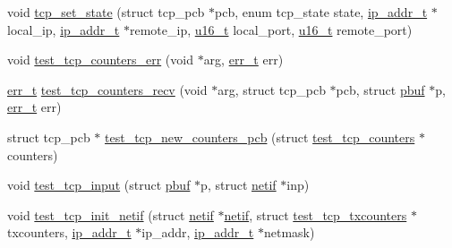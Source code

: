 \begin{DoxyCompactItemize}
\item 
void \hyperlink{openmote-cc2538_2lwip_2test_2unit_2tcp_2tcp__helper_8c_a39f3f73a5ac75fb0de5253cc0a1da423}{tcp\+\_\+set\+\_\+state} (struct tcp\+\_\+pcb $\ast$pcb, enum tcp\+\_\+state state, \hyperlink{native_2lwip_2src_2include_2lwip_2ip__addr_8h_a88b43639738c4de2d3cd22e3a1fd7696}{ip\+\_\+addr\+\_\+t} $\ast$local\+\_\+ip, \hyperlink{native_2lwip_2src_2include_2lwip_2ip__addr_8h_a88b43639738c4de2d3cd22e3a1fd7696}{ip\+\_\+addr\+\_\+t} $\ast$remote\+\_\+ip, \hyperlink{group__compiler__abstraction_ga77570ac4fcab86864fa1916e55676da2}{u16\+\_\+t} local\+\_\+port, \hyperlink{group__compiler__abstraction_ga77570ac4fcab86864fa1916e55676da2}{u16\+\_\+t} remote\+\_\+port)
\item 
void \hyperlink{openmote-cc2538_2lwip_2test_2unit_2tcp_2tcp__helper_8c_a3ddbc387487935205c08c161223031c7}{test\+\_\+tcp\+\_\+counters\+\_\+err} (void $\ast$arg, \hyperlink{group__infrastructure__errors_gaf02d9da80fd66b4f986d2c53d7231ddb}{err\+\_\+t} err)
\item 
\hyperlink{group__infrastructure__errors_gaf02d9da80fd66b4f986d2c53d7231ddb}{err\+\_\+t} \hyperlink{openmote-cc2538_2lwip_2test_2unit_2tcp_2tcp__helper_8c_a6618a2d98d08a43995474cd3ef6704fc}{test\+\_\+tcp\+\_\+counters\+\_\+recv} (void $\ast$arg, struct tcp\+\_\+pcb $\ast$pcb, struct \hyperlink{structpbuf}{pbuf} $\ast$p, \hyperlink{group__infrastructure__errors_gaf02d9da80fd66b4f986d2c53d7231ddb}{err\+\_\+t} err)
\item 
struct tcp\+\_\+pcb $\ast$ \hyperlink{openmote-cc2538_2lwip_2test_2unit_2tcp_2tcp__helper_8c_a4743f4d8687063a2fc6da6d448cfcdcf}{test\+\_\+tcp\+\_\+new\+\_\+counters\+\_\+pcb} (struct \hyperlink{structtest__tcp__counters}{test\+\_\+tcp\+\_\+counters} $\ast$counters)
\item 
void \hyperlink{openmote-cc2538_2lwip_2test_2unit_2tcp_2tcp__helper_8c_a310f0aa8ac7ce26d35fd91c69ff98bda}{test\+\_\+tcp\+\_\+input} (struct \hyperlink{structpbuf}{pbuf} $\ast$p, struct \hyperlink{structnetif}{netif} $\ast$inp)
\item 
void \hyperlink{openmote-cc2538_2lwip_2test_2unit_2tcp_2tcp__helper_8c_adce5a273dd4854e4d2b6282265e9fdb7}{test\+\_\+tcp\+\_\+init\+\_\+netif} (struct \hyperlink{structnetif}{netif} $\ast$\hyperlink{structnetif}{netif}, struct \hyperlink{structtest__tcp__txcounters}{test\+\_\+tcp\+\_\+txcounters} $\ast$txcounters, \hyperlink{native_2lwip_2src_2include_2lwip_2ip__addr_8h_a88b43639738c4de2d3cd22e3a1fd7696}{ip\+\_\+addr\+\_\+t} $\ast$ip\+\_\+addr, \hyperlink{native_2lwip_2src_2include_2lwip_2ip__addr_8h_a88b43639738c4de2d3cd22e3a1fd7696}{ip\+\_\+addr\+\_\+t} $\ast$netmask)
\end{DoxyCompactItemize}



